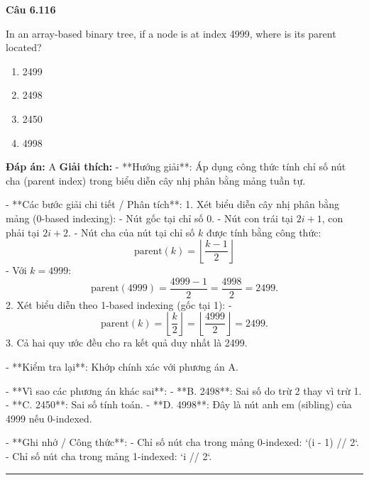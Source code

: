 \documentclass[11pt,a4paper]{article}
\newenvironment{question}[1]{%
  \par\vspace{1em}\noindent\textbf{\large Câu #1}\par\vspace{0.4em}
}{%
  \par\vspace{1em}\hrule\vspace{0.6em}
}
\newenvironment{choices}{%
  \begin{enumerate}[label=\textbf{\Alph*.},leftmargin=2.2em,itemsep=2pt,topsep=3pt]
}{%
  \end{enumerate}
}
\newcommand{\choice}{\item}
\begin{document}
\begin{question}{6.116}
In an array-based binary tree, if a node is at index 4999, where is its parent located?
\begin{choices}
\choice 2499
\choice 2498
\choice 2450
\choice 4998
\end{choices}
\textbf{Đáp án:} A
\textbf{Giải thích:} - **Hướng giải**:
  Áp dụng công thức tính chỉ số nút cha (parent index) trong biểu diễn cây nhị phân bằng mảng tuần tự.

- **Các bước giải chi tiết / Phân tích**:
  1. Xét biểu diễn cây nhị phân bằng mảng (0-based indexing):
     - Nút gốc tại chỉ số 0.
     - Nút con trái tại \(2i + 1\), con phải tại \(2i + 2\).
     - Nút cha của nút tại chỉ số \(k\) được tính bằng công thức:
       \[ \text{parent}(k) = \left\lfloor \frac{k - 1}{2} \right\rfloor \]
     - Với \(k = 4999\):
       \[ \text{parent}(4999) = \frac{4999 - 1}{2} = \frac{4998}{2} = 2499. \]
  2. Xét biểu diễn theo 1-based indexing (gốc tại 1):
     - \[ \text{parent}(k) = \left\lfloor \frac{k}{2} \right\rfloor = \left\lfloor \frac{4999}{2} \right\rfloor = 2499. \]
  3. Cả hai quy ước đều cho ra kết quả duy nhất là 2499.

- **Kiểm tra lại**:
  Khớp chính xác với phương án A.

- **Vì sao các phương án khác sai**:
  - **B. 2498**: Sai số do trừ 2 thay vì trừ 1.
  - **C. 2450**: Sai số tính toán.
  - **D. 4998**: Đây là nút anh em (sibling) của 4999 nếu 0-indexed.

- **Ghi nhớ / Công thức**:
  - Chỉ số nút cha trong mảng 0-indexed: `(i - 1) // 2`.
  - Chỉ số nút cha trong mảng 1-indexed: `i // 2`.
\end{question}
\end{document}

